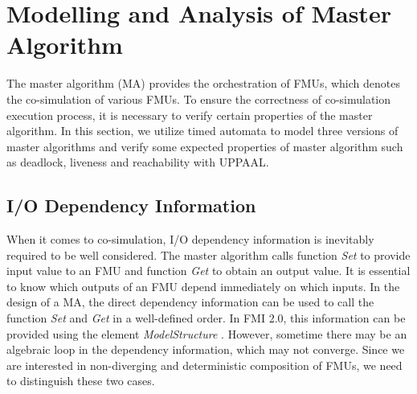 \section{Modelling and Analysis of Master Algorithm}
\label{sec:ma}
The master algorithm (MA) provides the orchestration of FMUs, which denotes the co-simulation of various FMUs. To ensure the correctness of co-simulation execution process, it is necessary to verify certain properties of the master algorithm. In this section, we utilize timed automata to model three versions of master algorithms and verify some expected properties of master algorithm such as deadlock, liveness and reachability with UPPAAL.
\subsection{I/O Dependency Information}
When it comes to co-simulation, I/O dependency information \cite{BromanBGLMTW13} is inevitably required to be well considered. The master algorithm calls function \emph{Set} to provide input value to an FMU and function \emph{Get} to obtain an output value. It is essential to know which outputs of an FMU depend immediately on which inputs. In the design of a MA, the direct dependency information can be used to call the function \emph{Set} and \emph{Get} in a well-defined order. In FMI 2.0, this information can be provided using the element \emph{ModelStructure} \cite{FMI2INTRO}. However, sometime there may be an algebraic loop in the dependency information, which may not converge. Since we are interested in non-diverging and deterministic composition of FMUs, we need to distinguish these two cases. 
